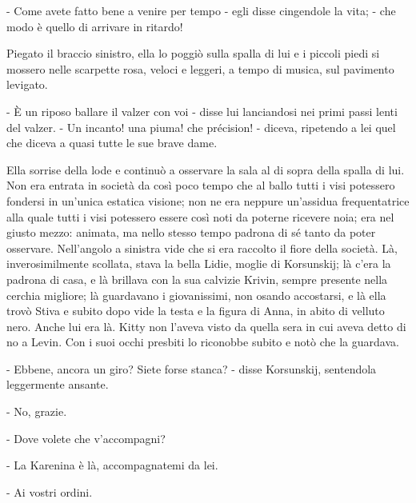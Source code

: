 - Come avete fatto bene a venire per tempo - egli disse cingendole la vita; - che modo è quello di arrivare in ritardo! 

Piegato il braccio sinistro, ella lo poggiò sulla spalla di lui e i piccoli piedi si mossero nelle scarpette rosa, veloci e leggeri, a tempo di musica, sul pavimento levigato. 

- È un riposo ballare il valzer con voi - disse lui lanciandosi nei primi passi lenti del valzer. - Un incanto! una piuma! che précision! - diceva, ripetendo a lei quel che diceva a quasi tutte le sue brave dame. 

Ella sorrise della lode e continuò a osservare la sala al di sopra della spalla di lui. Non era entrata in società da così poco tempo che al ballo tutti i visi potessero fondersi in un'unica estatica visione; non ne era neppure un'assidua frequentatrice alla quale tutti i visi potessero essere così noti da poterne ricevere noia; era nel giusto mezzo: animata, ma nello stesso tempo padrona di sé tanto da poter osservare. Nell'angolo a sinistra vide che si era raccolto il fiore della società. Là, inverosimilmente scollata, stava la bella Lidie, moglie di Korsunskij; là c'era la padrona di casa, e là brillava con la sua calvizie Krivin, sempre presente nella cerchia migliore; là guardavano i giovanissimi, non osando accostarsi, e là ella trovò Stiva e subito dopo vide la testa e la figura di Anna, in abito di velluto nero. Anche lui era là. Kitty non l'aveva visto da quella sera in cui aveva detto di no a Levin. Con i suoi occhi presbiti lo riconobbe subito e notò che la guardava. 

- Ebbene, ancora un giro? Siete forse stanca? - disse Korsunskij, sentendola leggermente ansante. 

- No, grazie. 

- Dove volete che v'accompagni? 

- La Karenina è là, accompagnatemi da lei. 

- Ai vostri ordini. 

